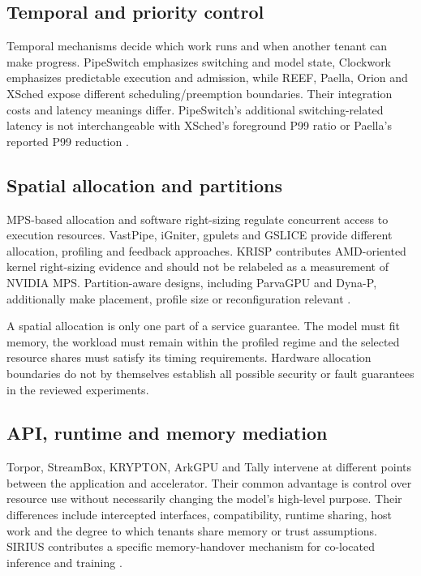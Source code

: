 \subsection{Temporal and priority control}
Temporal mechanisms decide which work runs and when another tenant can make progress. PipeSwitch emphasizes switching and model state, Clockwork emphasizes predictable execution and admission, while REEF, Paella, Orion and XSched expose different scheduling/preemption boundaries. Their integration costs and latency meanings differ. PipeSwitch's additional switching-related latency is not interchangeable with XSched's foreground P99 ratio or Paella's reported P99 reduction \cite{P004,P005,P006,P007,P009,P015}.

\subsection{Spatial allocation and partitions}
MPS-based allocation and software right-sizing regulate concurrent access to execution resources. VastPipe, iGniter, gpulets and GSLICE provide different allocation, profiling and feedback approaches. KRISP contributes AMD-oriented kernel right-sizing evidence and should not be relabeled as a measurement of NVIDIA MPS. Partition-aware designs, including ParvaGPU and Dyna-P, additionally make placement, profile size or reconfiguration relevant \cite{P001,P002,P003,P008,P011,P020,P021}.

A spatial allocation is only one part of a service guarantee. The model must fit memory, the workload must remain within the profiled regime and the selected resource shares must satisfy its timing requirements. Hardware allocation boundaries do not by themselves establish all possible security or fault guarantees in the reviewed experiments.

\subsection{API, runtime and memory mediation}
Torpor, StreamBox, KRYPTON, ArkGPU and Tally intervene at different points between the application and accelerator. Their common advantage is control over resource use without necessarily changing the model's high-level purpose. Their differences include intercepted interfaces, compatibility, runtime sharing, host work and the degree to which tenants share memory or trust assumptions. SIRIUS contributes a specific memory-handover mechanism for co-located inference and training \cite{P010,P012,P013,P014,P019,P022}.


